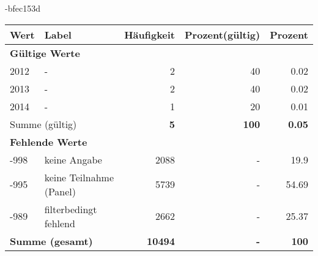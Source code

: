                 \vspace*{-\baselineskip}
					\begin{filecontents}{\jobname-bfec153d}
					\begin{longtable}{lXrrr}
					\toprule
					\textbf{Wert} & \textbf{Label} & \textbf{Häufigkeit} & \textbf{Prozent(gültig)} & \textbf{Prozent} \\
					\endhead
					\midrule
					\multicolumn{5}{l}{\textbf{Gültige Werte}}\\

					2012 &
					\multicolumn{1}{X}{ -  } &


					  \num{2} &
					  \num[round-mode=places,round-precision=2]{40} &
					    \num[round-mode=places,round-precision=2]{0.02} \\

					2013 &
					\multicolumn{1}{X}{ -  } &


					  \num{2} &
					  \num[round-mode=places,round-precision=2]{40} &
					    \num[round-mode=places,round-precision=2]{0.02} \\

					2014 &
					\multicolumn{1}{X}{ -  } &


					  \num{1} &
					  \num[round-mode=places,round-precision=2]{20} &
					    \num[round-mode=places,round-precision=2]{0.01} \\
					\midrule
					\multicolumn{2}{l}{Summe (gültig)} &
					  \textbf{\num{5}} &
					\textbf{\num{100}} &
					  \textbf{\num[round-mode=places,round-precision=2]{0.05}} \\
					\multicolumn{5}{l}{\textbf{Fehlende Werte}}\\
							-998 &
							keine Angabe &
							  \num{2088} &
							 - &
							  \num[round-mode=places,round-precision=2]{19.9} \\
							-995 &
							keine Teilnahme (Panel) &
							  \num{5739} &
							 - &
							  \num[round-mode=places,round-precision=2]{54.69} \\
							-989 &
							filterbedingt fehlend &
							  \num{2662} &
							 - &
							  \num[round-mode=places,round-precision=2]{25.37} \\
					\midrule
					\multicolumn{2}{l}{\textbf{Summe (gesamt)}} &
				      \textbf{\num{10494}} &
				    \textbf{-} &
				    \textbf{\num{100}} \\
					\bottomrule
					\end{longtable}
					\end{filecontents}
